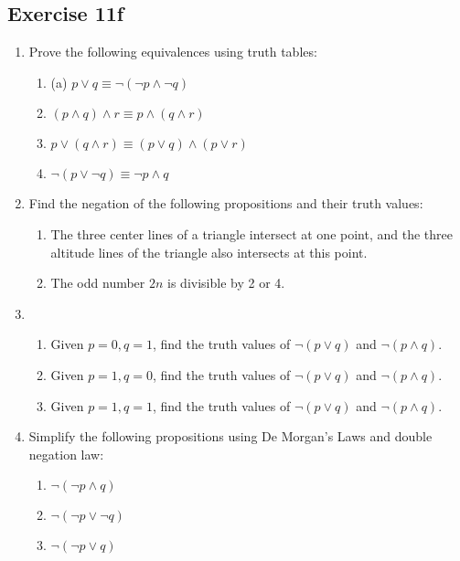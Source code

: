 \documentclass{report}
\begin{document}
\subsection*{Exercise 11f}
\begin{enumerate}[leftmargin=*]
    \item Prove the following equivalences using truth tables:
          \begin{enumerate}[leftmargin=*]
              \item (a) $p \lor q \equiv \neg(\neg p \land \neg q)$
              \item $(p \land q) \land r \equiv p \land(q \land r)$
              \item $p \lor(q \land r) \equiv(p \lor q) \land(p \lor r)$
              \item $\neg(p \lor \neg q) \equiv \neg p \land q$
          \end{enumerate}
    \item  Find the negation of the following propositions and their truth values:
          \begin{enumerate}[leftmargin=*]
              \item The three center lines of a triangle intersect at one point, and the three
                    altitude lines of the triangle also intersects at this point.
              \item The odd number $2n$ is divisible by 2 or 4.
          \end{enumerate}
    \item \begin{enumerate}[leftmargin=*]
              \item Given $p=0, q=1$, find the truth values of $\neg(p \lor q)$ and $\neg(p \land
                        q)$.
              \item Given $p=1, q=0$, find the truth values of $\neg(p \lor q)$ and $\neg(p \land
                        q)$.
              \item Given $p=1, q=1$, find the truth values of $\neg(p \lor q)$ and $\neg(p \land
                        q)$.
          \end{enumerate}
    \item Simplify the following propositions using De Morgan's Laws and double negation
          law:
          \begin{enumerate}[leftmargin=*]
              \item $\neg(\neg p \land q)$
              \item $\neg(\neg p \lor \neg q)$
              \item $\neg(\neg p \lor q)$
          \end{enumerate}
\end{enumerate}
\end{document}
